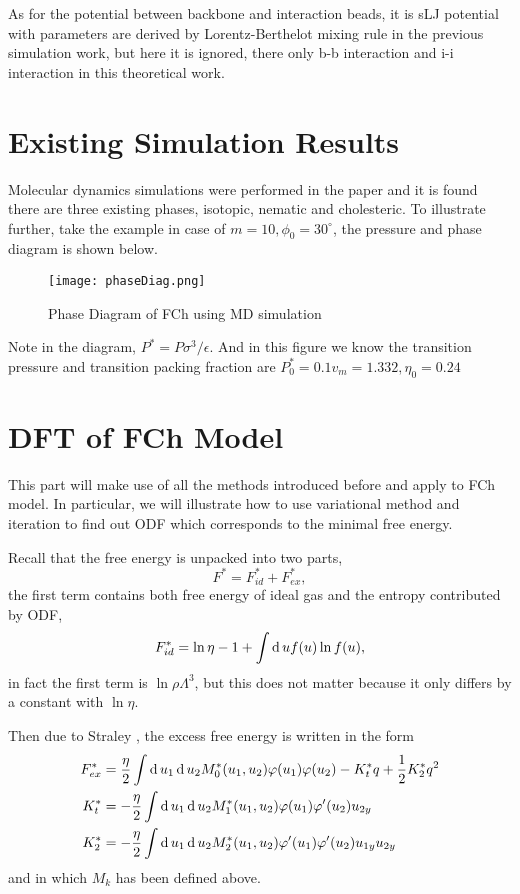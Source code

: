 As for the potential between backbone and interaction beads, it is sLJ potential with parameters are derived by Lorentz-Berthelot mixing rule in the previous simulation work, but here it is ignored, there only b-b interaction and i-i interaction in this theoretical work.

\section{Existing Simulation Results}\label{Sec:SimRes}
Molecular dynamics simulations were performed in the paper and it is found there are three existing phases, isotopic, nematic and cholesteric. To illustrate further, take the example in case of $m=10, \phi_0=30^\circ$, the pressure and phase diagram is shown below.

\begin{figure}[H]
 	\centering
 	\texttt{[image: phaseDiag.png]}
	\caption[Phase diagram of FCh using MD simulation]{Phase Diagram of FCh using MD simulation\cite{Liang2019PRE}}
	\label{fig:MDdiag}
\end{figure}

Note in the diagram, $P^*=P\sigma^3/\epsilon$. And in this figure we know the transition pressure and transition packing fraction are $P_0^*=0.1v_m=1.332, \eta_0=0.24$

\section{DFT of FCh Model}
This part will make use of all the methods introduced before and apply to FCh model. In particular, we will illustrate how to use variational method and iteration to find out ODF which corresponds to the minimal free energy.

Recall that the free energy is unpacked into two parts,
\begin{equation}
	F^*=F_{id}^*+F_{ex}^*,
\end{equation}
the first term contains both free energy of ideal gas and the entropy contributed by ODF,
\begin{equation}
	F_{id}^*=\ln\eta-1+\int\operatorname{d}uf(u)\ln f(u),
\end{equation}
in fact the first term is $\ln\rho\Lambda^3$, but this does not matter because it only differs by a constant with $\ln\eta$.

Then due to Straley\cite{Straley1973Frank, Straley1976Theory} , the excess free energy is written in the form
\begin{align}
	F_{ex}^*&=\frac{\eta}{2}\int\operatorname{d}u_1\operatorname{d}u_2M_0^*(u_1,u_2)\varphi(u_1)\varphi(u_2)-K_t^*q+\frac{1}{2}K_2^*q^2\\
	K_t^*&=-\frac{\eta}{2}\int\operatorname{d}u_1\operatorname{d}u_2M_1^*(u_1,u_2)\varphi(u_1)\varphi'(u_2)u_{2y}\\
	K_2^*&=-\frac{\eta}{2}\int\operatorname{d}u_1\operatorname{d}u_2M_2^*(u_1,u_2)\varphi'(u_1)\varphi'(u_2)u_{1y}u_{2y}
\end{align}
and in which $M_k$ has been defined above.

